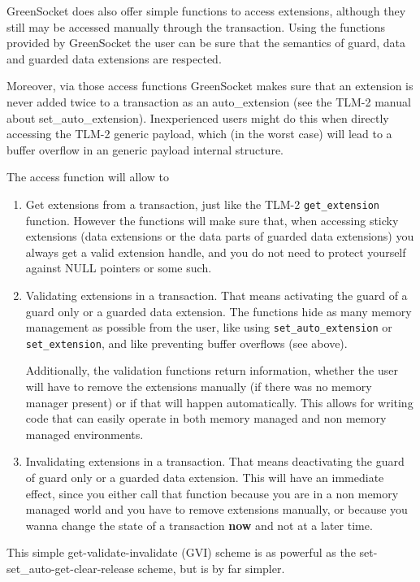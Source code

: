 \documentclass[a4paper,10pt]{article}          %
\begin{document}
GreenSocket does also offer simple functions to access extensions, although they still may be accessed manually through the transaction. Using the functions provided by GreenSocket the user can be sure that the semantics of guard, data and guarded data extensions are respected.

Moreover, via those access functions GreenSocket makes sure that an extension is never added twice to a transaction as an auto\_extension (see the TLM-2 manual about set\_auto\_extension). Inexperienced users might do this when directly accessing the TLM-2 generic payload, which (in the worst case) will lead to a buffer overflow in an generic payload internal structure.

The access function will allow to
\begin{enumerate}
\item 
Get extensions from a transaction, just like the TLM-2 \verb|get_extension| function. However the functions will make sure that, when accessing sticky extensions (data extensions or the data parts of guarded data extensions) you always get a valid extension handle, and you do not need to protect yourself against NULL pointers or some such.

\item 
Validating extensions in a transaction. That means activating the guard of a guard only or a guarded data extension. The functions hide as many memory management as possible from the user, like using \verb|set_auto_extension| or \verb|set_extension|, and like preventing buffer overflows (see above).

Additionally, the validation functions return information, whether the user will have to remove the extensions manually (if there was no memory manager present) or if that will happen automatically. This allows for writing code that can easily operate in both memory managed and non memory managed environments.

\item
Invalidating extensions in a transaction. That means deactivating the guard of guard only or a guarded data extension. This will have an immediate effect, since you either call that function because you are in a non memory managed world and you have to remove extensions manually, or because you wanna change the state of a transaction \textbf{now} and not at a later time.

\end{enumerate}

This simple get-validate-invalidate (GVI) scheme is as powerful as the set-set\_auto-get-clear-release scheme, but is by far simpler.
\end{document}
